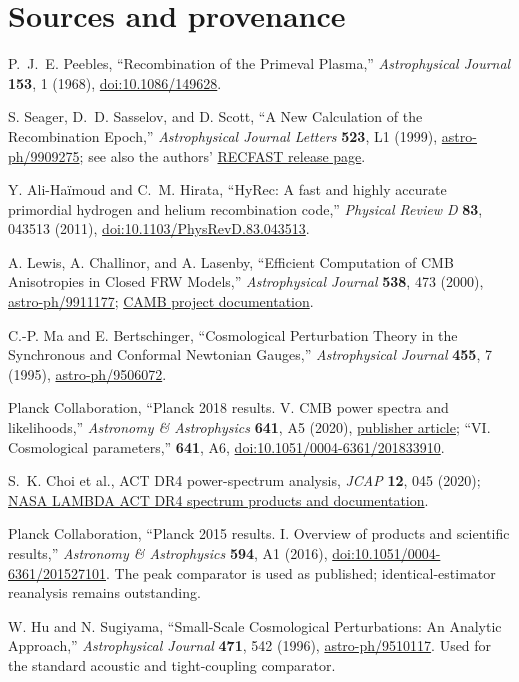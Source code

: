 \section{Sources and provenance}
\begin{enumerate}[label={[IX.\arabic*]}]
\item P.~J.~E. Peebles, ``Recombination of the Primeval Plasma,'' \emph{Astrophysical Journal} \textbf{153}, 1 (1968), \href{https://doi.org/10.1086/149628}{doi:10.1086/149628}.
\item S. Seager, D.~D. Sasselov, and D. Scott, ``A New Calculation of the Recombination Epoch,'' \emph{Astrophysical Journal Letters} \textbf{523}, L1 (1999), \href{https://arxiv.org/abs/astro-ph/9909275}{astro-ph/9909275}; see also the authors' \href{https://www.astro.ubc.ca/people/scott/recfast.html}{RECFAST release page}.
\item Y. Ali-Ha\"imoud and C.~M. Hirata, ``HyRec: A fast and highly accurate primordial hydrogen and helium recombination code,'' \emph{Physical Review D} \textbf{83}, 043513 (2011), \href{https://doi.org/10.1103/PhysRevD.83.043513}{doi:10.1103/PhysRevD.83.043513}.
\item A. Lewis, A. Challinor, and A. Lasenby, ``Efficient Computation of CMB Anisotropies in Closed FRW Models,'' \emph{Astrophysical Journal} \textbf{538}, 473 (2000), \href{https://arxiv.org/abs/astro-ph/9911177}{astro-ph/9911177}; \href{https://camb.info/}{CAMB project documentation}.
\item C.-P. Ma and E. Bertschinger, ``Cosmological Perturbation Theory in the Synchronous and Conformal Newtonian Gauges,'' \emph{Astrophysical Journal} \textbf{455}, 7 (1995), \href{https://arxiv.org/abs/astro-ph/9506072}{astro-ph/9506072}.
\item Planck Collaboration, ``Planck 2018 results. V. CMB power spectra and likelihoods,'' \emph{Astronomy \& Astrophysics} \textbf{641}, A5 (2020), \href{https://www.aanda.org/articles/aa/full_html/2020/09/aa36386-19/aa36386-19.html}{publisher article}; ``VI. Cosmological parameters,'' \textbf{641}, A6, \href{https://doi.org/10.1051/0004-6361/201833910}{doi:10.1051/0004-6361/201833910}.
\item S.~K. Choi et al., ACT DR4 power-spectrum analysis, \emph{JCAP} \textbf{12}, 045 (2020); \href{https://lambda.gsfc.nasa.gov/product/act/act_dr4_spectra_info.html}{NASA LAMBDA ACT DR4 spectrum products and documentation}.
\item Planck Collaboration, ``Planck 2015 results. I. Overview of products and scientific results,'' \emph{Astronomy \& Astrophysics} \textbf{594}, A1 (2016), \href{https://doi.org/10.1051/0004-6361/201527101}{doi:10.1051/0004-6361/201527101}. The peak comparator is used as published; identical-estimator reanalysis remains outstanding.
\item W. Hu and N. Sugiyama, ``Small-Scale Cosmological Perturbations: An Analytic Approach,'' \emph{Astrophysical Journal} \textbf{471}, 542 (1996), \href{https://arxiv.org/abs/astro-ph/9510117}{astro-ph/9510117}. Used for the standard acoustic and tight-coupling comparator.
\end{enumerate}

